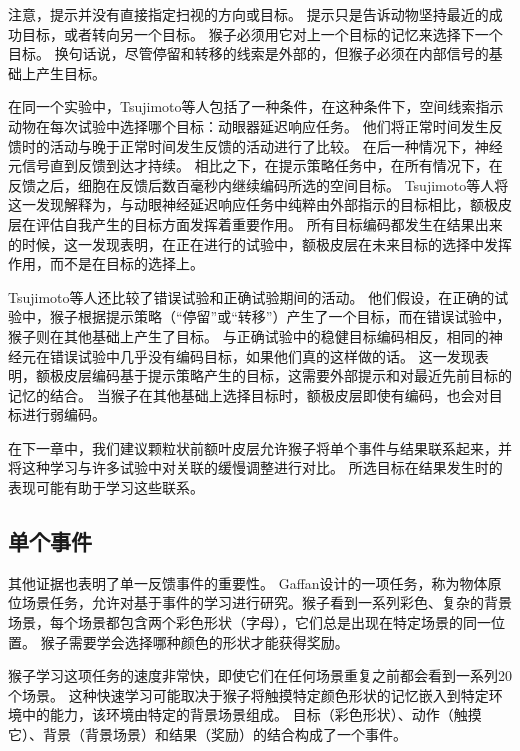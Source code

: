 注意，提示并没有直接指定扫视的方向或目标。
提示只是告诉动物坚持最近的成功目标，或者转向另一个目标。
猴子必须用它对上一个目标的记忆来选择下一个目标。
换句话说，尽管停留和转移的线索是外部的，但猴子必须在内部信号的基础上产生目标。\par


在同一个实验中，Tsujimoto等人包括了一种条件，在这种条件下，空间线索指示动物在每次试验中选择哪个目标：动眼器延迟响应任务。
他们将正常时间发生反馈时的活动与晚于正常时间发生反馈的活动进行了比较。
在后一种情况下，神经元信号直到反馈到达才持续。
相比之下，在提示策略任务中，在所有情况下，在反馈之后，细胞在反馈后数百毫秒内继续编码所选的空间目标。
Tsujimoto等人将这一发现解释为，与动眼神经延迟响应任务中纯粹由外部指示的目标相比，额极皮层在评估自我产生的目标方面发挥着重要作用。
所有目标编码都发生在结果出来的时候，这一发现表明，在正在进行的试验中，额极皮层在未来目标的选择中发挥作用，而不是在目标的选择上。\par


Tsujimoto等人还比较了错误试验和正确试验期间的活动。
他们假设，在正确的试验中，猴子根据提示策略（“停留”或“转移”）产生了一个目标，而在错误试验中，猴子则在其他基础上产生了目标。
与正确试验中的稳健目标编码相反，相同的神经元在错误试验中几乎没有编码目标，如果他们真的这样做的话。
这一发现表明，额极皮层编码基于提示策略产生的目标，这需要外部提示和对最近先前目标的记忆的结合。
当猴子在其他基础上选择目标时，额极皮层即使有编码，也会对目标进行弱编码。\par


在下一章中，我们建议颗粒状前额叶皮层允许猴子将单个事件与结果联系起来，并将这种学习与许多试验中对关联的缓慢调整进行对比。
所选目标在结果发生时的表现可能有助于学习这些联系。\par



\subsection{单个事件}

其他证据也表明了单一反馈事件的重要性。
Gaffan\cite{gaffan1992amnesia}设计的一项任务，称为物体原位场景任务，允许对基于事件的学习进行研究。猴子看到一系列彩色、复杂的背景场景，每个场景都包含两个彩色形状（字母），它们总是出现在特定场景的同一位置。
猴子需要学会选择哪种颜色的形状才能获得奖励。\par


猴子学习这项任务的速度非常快，即使它们在任何场景重复之前都会看到一系列20个场景。
这种快速学习可能取决于猴子将触摸特定颜色形状的记忆嵌入到特定环境中的能力，该环境由特定的背景场景组成。
目标（彩色形状）、动作（触摸它）、背景（背景场景）和结果（奖励）的结合构成了一个事件。\par


